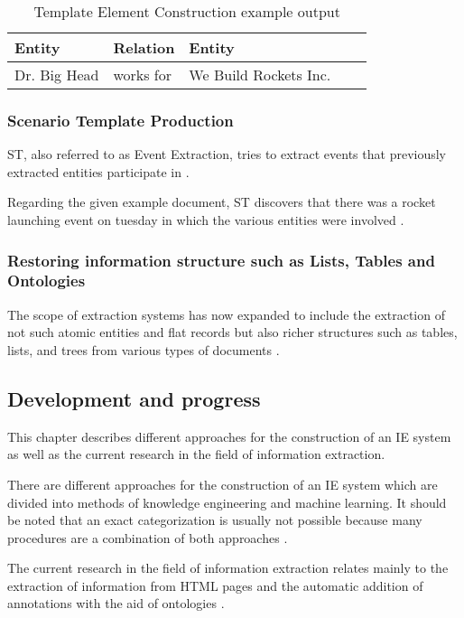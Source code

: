 \begin{table}[H]
\centering
\begin{tabular*}{\textwidth}{ l l l l l }
	\toprule
	\textbf{Entity} & \textbf{Relation}  & \textbf{Entity} \\
	\midrule
	Dr. Big Head & works for & We Build Rockets Inc. \\
	\bottomrule
\end{tabular*}
\caption{Template Element Construction example output}
\end{table}

\subsubsection{Scenario Template Production}
\gls{ST}, also referred to as Event Extraction, tries to extract events that previously extracted entities participate in \cite{Cunningham:2005}.

Regarding the given example document, \gls{ST} discovers that there was a rocket launching event on tuesday in which the various entities were involved \cite{Cunningham:2005}.

\subsubsection{Restoring information structure such as Lists, Tables and Ontologies}
The scope of extraction systems has now expanded to include the extraction of not such atomic entities and flat records but also richer structures such as tables, lists, and trees from various types of documents \cite{Sarawagi:2008}.

\newpage
\subsection{Development and progress}
This chapter describes different approaches for the construction of an IE system as well as the current research in the field of information extraction.

There are different approaches for the construction of an IE system which are divided into methods of knowledge engineering and machine learning. It should be noted that an exact categorization is usually not possible because many procedures are a combination of both approaches \cite{Schramm:2008}.

The current research in the field of information extraction relates mainly to the extraction of information from HTML pages and the automatic addition of annotations with the aid of ontologies \cite{Linsmayr:2010}.

